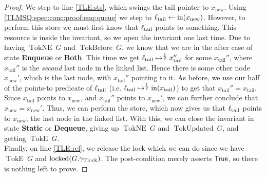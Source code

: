 \documentclass[a4paper, 10pt]{report}
\theoremstyle{definition}
\newcommand{\locked}{\operatorname{locked}}
\newcommand{\locN}[1]{\loc_{\mathrm{#1}}}
\newcommand{\loctail}{\locN{tail}}
\newcommand{\nIn}[1]{\operatorname{in}(#1)}
\newcommand{\node}{x}
\newcommand{\nodeN}[1]{\node_{\mathrm{#1}}}
\newcommand{\nodetail}{\nodeN{tail}}
\newcommand{\nodenew}{\nodeN{new}}
\newcommand{\StaticState}{\textbf{Static}\xspace}
\newcommand{\EnqueueState}{\textbf{Enqueue}\xspace}
\newcommand{\DequeueState}{\textbf{Dequeue}\xspace}
\newcommand{\BothState}{\textbf{Both}\xspace}
\newcommand{\Qg}{G}
\newcommand{\gtlock}{\gname_{\mathrm{Tlock}}}
\newcommand{\TokE}[1]{\operatorname{TokE} ~ #1}
\newcommand{\TokEQg}{\TokE{\Qg}}
\newcommand{\TokNE}[1]{\operatorname{TokNE} ~ #1}
\newcommand{\TokNEQg}{\TokNE{\Qg}}
\newcommand{\TokBefore}[1]{\operatorname{TokBefore} ~ #1}
\newcommand{\TokBeforeQg}{\TokBefore{\Qg}}
\newcommand{\TokUpdated}[1]{\operatorname{TokUpdated} ~ #1}
\newcommand{\TokUpdatedQg}{\TokUpdated{\Qg}}
\begin{document}
\begin{proof}
We step to line \ref{TLE:sts}, which swings the tail pointer to $\nodenew$. Using \ref{TLMSQ:spec:conc:proof:enq:queue} we step to $\loctail \gets \nIn{\nodenew}$. However, to perform this store we must first know that $\loctail$ points to something. This resource is inside the invariant, so we open the invariant one last time. Due to having $\TokNEQg$ and $\TokBeforeQg$, we know that we are in the after case of state \EnqueueState or \BothState. This time we get $\loctail \mapsto^{\frac{1}{2}} \nodetail''$ for some $\nodetail''$, where $\nodetail''$ is the \textit{second} last node in the linked list. Hence there is some other node $\nodenew'$, which is the last node, with $\nodetail''$ pointing to it. As before, we use our half of the points-to predicate of $\loctail$ (i.e. $\loctail \mapsto^{\frac{1}{2}} \nIn{\nodetail}$) to get that $\nodetail'' = \nodetail$. Since $\nodetail$ points to $\nodenew$, and $\nodetail''$ points to $\nodenew'$, we can further conclude that $\nodenew = \nodenew'$. Thus, we can perform the store, which now gives us that $\loctail$ points to $\nodenew$; the last node in the linked list. With this, we can close the invariant in state \StaticState or \DequeueState, giving up $\TokNEQg$ and $\TokUpdatedQg$, and getting $\TokEQg$.\\
Finally, on line \ref{TLE:rel}, we release the lock which we can do since we have $\TokEQg$ and $\locked(\Qg.\gtlock)$. The post-condition merely asserts $\textsf{True}$, so there is nothing left to prove.
\end{proof}
\end{document}
